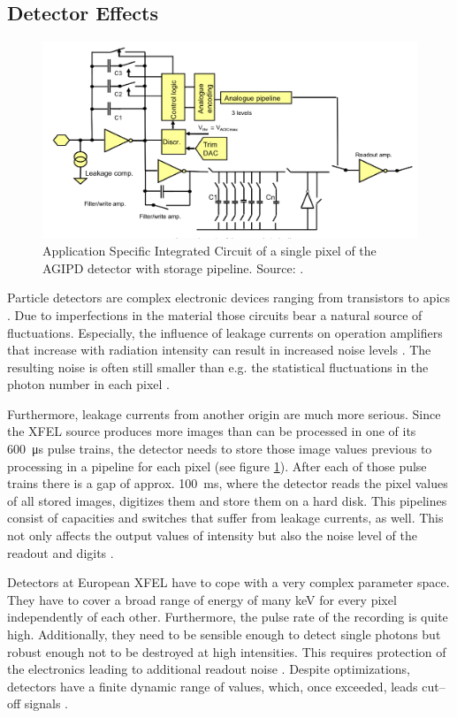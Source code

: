 \subsection{Detector Effects}
\begin{figure}
\centering
\includegraphics[width=.5\textwidth]{figures/AGIPD.png}
\caption{Application Specific Integrated Circuit of a single pixel of the AGIPD detector with storage pipeline. Source: \cite{henrich2011adaptive}.}
\label{abb. AGIPD}
\end{figure}
Particle detectors are complex electronic devices ranging from
transistors to \glspl{apic}
\cite{potdevin2011analysis} \cite{shi2010challenges}. Due to imperfections in
the material those circuits bear a natural source of fluctuations. Especially,
the influence of leakage currents on operation amplifiers that increase with
radiation intensity can result in increased noise levels
\cite{shi2010challenges}. The resulting noise is often still
smaller than e.g. the statistical fluctuations in the photon number in each
pixel \cite{shi2010challenges}.

Furthermore, leakage currents from another origin are much more serious. Since
the XFEL source produces more images than can be processed in one of its
\SI{600}{\micro\second} pulse trains, the detector needs to store those image values previous
to processing in a pipeline for each pixel (see figure \ref{abb. AGIPD}). After
each of those pulse trains there is a gap of approx. \SI{100}{\milli\second}, where the detector
reads the pixel values of all stored images, digitizes them and store them on a
hard disk. This pipelines consist of capacities and switches that suffer from
leakage currents, as well. This not only affects the output values of intensity
but also the noise level of the readout and digits \cite{shi2010challenges}.

Detectors at European XFEL have to cope with a very complex parameter space.
They have to cover a broad range of energy of many \si{\kilo\electronvolt} for every pixel
independently of each other. Furthermore, the pulse rate of the recording is
quite high. Additionally, they need to be sensible enough to detect single
photons but robust enough not to be destroyed at high intensities. This requires
protection of the electronics leading to additional readout noise
\cite{potdevin2011analysis}. Despite optimizations, detectors have a finite
dynamic range of values, which, once exceeded, leads
cut--off signals \cite{potdevin2011analysis}.

